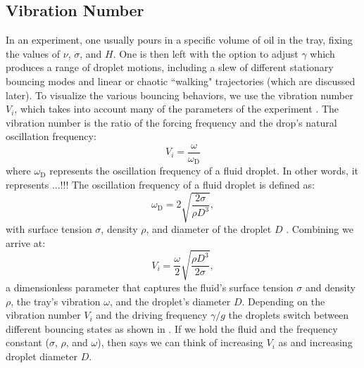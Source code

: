 \subsection{Vibration Number}

In an experiment, one usually pours in a specific volume of oil in the tray, fixing the values of $\nu$, $\sigma$, and $H$. One is then left with the option to adjust $\gamma$ which produces a range of droplet motions, including a slew of different stationary bouncing modes and linear or chaotic ``walking" trajectories (which are discussed later). To visualize the various bouncing behaviors, we use the vibration number $V_i$, which takes into account many of the parameters of the experiment . The vibration number is the ratio of the forcing frequency and the drop's natural oscillation frequency:
\begin{equation} \label{vibrationnumber1}
V_i = \frac{\omega}{\omega_\mathrm{D}}
\end{equation}   
where $\omega_\mathrm{D}$ represents the oscillation frequency of a fluid droplet. In other words, it represents ...!!! The oscillation frequency of a fluid droplet is defined as:
\begin{equation} \label{oscillationfrequency}
\omega_\mathrm{D} = 2\sqrt{\frac{2\sigma}{\rho D^3}},
\end{equation}   
with surface tension $\sigma$, density $\rho$, and diameter of the droplet $D$ . Combining  we arrive at:
\begin{equation} \label{vibrationnumber2}
V_i = \frac{\omega}{2}\sqrt{\frac{\rho D^3}{2\sigma}},
\end{equation}   	       	       
a dimensionless parameter that captures the fluid's surface tension $\sigma$ and density $\rho$, the tray's vibration $\omega$, and the droplet's diameter $D$. Depending on the vibration number $V_i$ and the driving frequency $\gamma/g$ the droplets switch between different bouncing states as shown in . If we hold the fluid and the frequency constant ($\sigma$, $\rho$, and $\omega$), then  says we can think of increasing $V_i$ as and increasing droplet diameter $D$. 
	    
